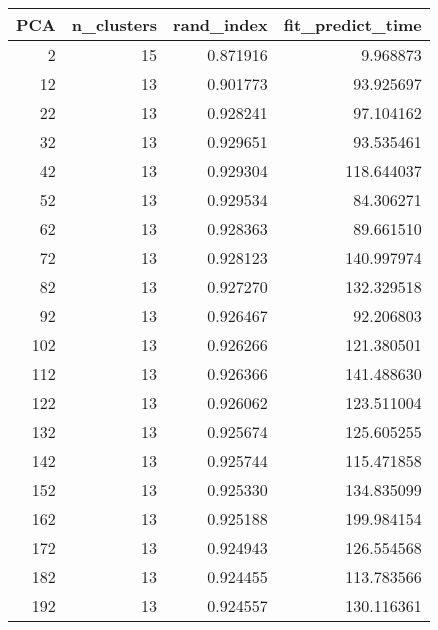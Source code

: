 \begin{tabular}{rrrr}
\toprule
PCA & n_clusters & rand_index & fit_predict_time \\
\midrule
2 & 15 & 0.871916 & 9.968873 \\
12 & 13 & 0.901773 & 93.925697 \\
22 & 13 & 0.928241 & 97.104162 \\
32 & 13 & 0.929651 & 93.535461 \\
42 & 13 & 0.929304 & 118.644037 \\
52 & 13 & 0.929534 & 84.306271 \\
62 & 13 & 0.928363 & 89.661510 \\
72 & 13 & 0.928123 & 140.997974 \\
82 & 13 & 0.927270 & 132.329518 \\
92 & 13 & 0.926467 & 92.206803 \\
102 & 13 & 0.926266 & 121.380501 \\
112 & 13 & 0.926366 & 141.488630 \\
122 & 13 & 0.926062 & 123.511004 \\
132 & 13 & 0.925674 & 125.605255 \\
142 & 13 & 0.925744 & 115.471858 \\
152 & 13 & 0.925330 & 134.835099 \\
162 & 13 & 0.925188 & 199.984154 \\
172 & 13 & 0.924943 & 126.554568 \\
182 & 13 & 0.924455 & 113.783566 \\
192 & 13 & 0.924557 & 130.116361 \\
\bottomrule
\end{tabular}
